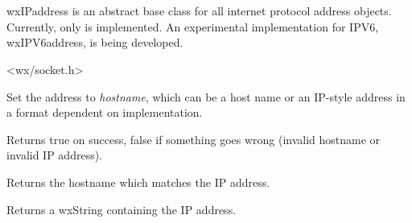 \section{}\label{wxipaddress}

wxIPaddress is an abstract base class for all internet protocol address 
objects. Currently, only  
is implemented. An experimental implementation for IPV6, wxIPV6address,
is being developed.




<wx/socket.h>


%
%



Set the address to {\it hostname}, which can be a host name
or an IP-style address in a format dependent on implementation.


Returns true on success, false if something goes wrong
(invalid hostname or invalid IP address).

%
%



Returns the hostname which matches the IP address.

%
%



Returns a wxString containing the IP address.

%
%



